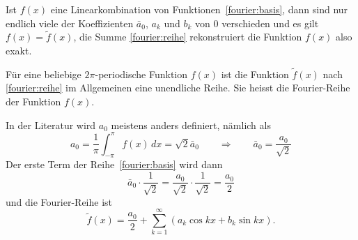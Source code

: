 Ist $f(x)$ eine Linearkombination von Funktionen~\eqref{fourier:basis},
dann sind nur endlich viele der Koeffizienten $\bar{a}_0$, $a_k$ und $b_k$
von $0$ verschieden und es gilt $f(x)=\tilde f(x)$, die Summe
\eqref{fourier:reihe} rekonstruiert die Funktion $f(x)$ also exakt.

Für eine beliebige $2\pi$-periodische Funktion $f(x)$ ist die Funktion
$\tilde f(x)$ nach \eqref{fourier:reihe} im Allgemeinen eine unendliche
Reihe.
Sie heisst die Fourier-Reihe der Funktion 
$f(x)$.

In der Literatur wird $a_0$ meistens anders definiert, nämlich als
\[
a_0 = \frac1{\pi}\int_{-\pi}^{\pi} f(x)\,dx = \sqrt{2}\bar{a}_0
\qquad\Rightarrow\qquad
\bar{a}_0 = \frac{a_0}{\sqrt{2}}
\]
Der erste Term der Reihe~\eqref{fourier:basis} wird dann
\[
\bar{a}_0\cdot\frac1{\sqrt{2}}
=
\frac{a_0}{\sqrt{2}}\cdot\frac{1}{\sqrt{2}}
=
\frac{a_0}2
\]
und die Fourier-Reihe ist
\begin{equation}
\tilde f(x)
=
\frac{a_0}2
+
\sum_{k=1}^\infty (a_k\cos kx+b_k\sin kx).
\end{equation}

